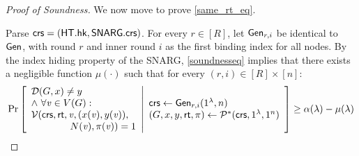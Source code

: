 \begin{proof}[Proof of Soundness]
We now move to prove \cref{same_rt_eq}.%

Parse $\mathsf{crs} = (\mathsf{HT}.\mathsf{hk}, \mathsf{SNARG}.\mathsf{crs})$. For every $r\in[R]$, let $\mathsf{Gen}_{r,i}$ be identical to $\mathsf{Gen}$, with round $r$ and inner round $i$ as the first binding index for all nodes. By the index hiding property of the SNARG, \cref{soundnesseq} implies that there exists a negligible function $\mu(\cdot)$ such that for every $(r,i)\in[R]\times[n]$:
\begin{gather*}\label{soundness}
    \Pr \left[ \begin{array}{ll} 
    \mathcal{D}(G, x)\neq y \\ 
    \wedge\ \forall \mathit{ v }\in V(G) : \\
    \mathcal{V}(\mathsf{crs}, \mathsf{rt}, \mathit{ v }, (x(\mathit{ v }), y(\mathit{ v })),\\
    \qquad \qquad N(\mathit{ v }), \pi(\mathit{ v })) = 1
     \end{array} \middle\vert \begin{array}{ll} 
    \mathsf{crs} \leftarrow \mathsf{Gen}_{r,i}(1^\lambda, n) \\
    (G, x, y, \mathsf{rt}, \pi) \leftarrow \mathcal{P}^*(\mathsf{crs}, 1^\lambda, 1^n)
     \end{array} \right] \geq \alpha(\lambda) - \mu(\lambda)
\end{gather*}


\end{proof}
